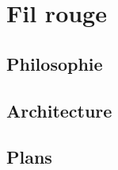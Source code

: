 \section{Fil rouge}

\subsection{Philosophie} %





\subsection{Architecture} %





\subsection{Plans} %









